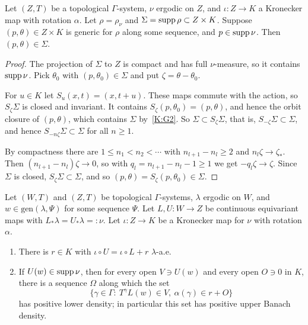 \begin{lemma}\label{K:lem:stab}
Let $(Z,T)$ be a topological $\Gamma$-system, $\nu$ ergodic on $Z$, and $\iota\colon Z\to K$ a
Kronecker map with rotation $\alpha$. Let $\rho=\rho_\nu$ and $\Sigma=\operatorname{supp}\rho\subset Z\times K$.
Suppose $(p,\theta)\in Z\times K$ is generic for $\rho$ along some \Fol{} sequence, and
$p\in\operatorname{supp}\nu$. Then $(p,\theta)\in\Sigma$.
\end{lemma}

\begin{proof}
The projection of $\Sigma$ to $Z$ is compact and has full $\nu$-measure, so it contains
$\operatorname{supp}\nu$. Pick $\theta_0$ with $(p,\theta_0)\in\Sigma$ and put $\zeta=\theta-\theta_0$.

For $u\in K$ let $S_u(x,t)=(x,t+u)$. These maps commute with the action, so $S_\zeta\Sigma$
is closed and invariant. It contains $S_\zeta(p,\theta_0)=(p,\theta)$, and hence the orbit closure
of $(p,\theta)$, which contains $\Sigma$ by~\ref{K:G2}.
So $\Sigma\subset S_\zeta\Sigma$, that is, $S_{-\zeta}\Sigma\subset\Sigma$, and hence
$S_{-n\zeta}\Sigma\subset\Sigma$ for all $n\ge1$.

By compactness there are $1\le n_1<n_2<\cdots$ with $n_{l+1}-n_l\ge2$ and $n_l\zeta\to\zeta_*$.
Then $(n_{l+1}-n_l)\zeta\to0$, so with $q_l=n_{l+1}-n_l-1\ge1$ we get $-q_l\zeta\to\zeta$.
Since $\Sigma$ is closed, $S_\zeta\Sigma\subset\Sigma$, and so
$(p,\theta)=S_\zeta(p,\theta_0)\in\Sigma$.
\end{proof}

\begin{lemma}\label{K:lem:phase}
Let $(W,T)$ and $(Z,T)$ be topological $\Gamma$-systems, $\lambda$ ergodic on $W$, and
$w\in\mathrm{gen}(\lambda,\Psi)$ for some \Fol{} sequence $\Psi$.
Let $L,U\colon W\to Z$ be continuous equivariant maps with $L_*\lambda=U_*\lambda=:\nu$.
Let $\iota\colon Z\to K$ be a Kronecker map for $\nu$ with rotation $\alpha$.
\begin{enumerate}[label=(\alph*)]
\item\label{K:Pa} There is $r\in K$ with $\iota\circ U=\iota\circ L+r$ $\lambda$-a.e.
\item\label{K:Pb} If $U(w)\in\operatorname{supp}\nu$, then for every open $V\ni U(w)$ and every open $O\ni0$ in $K$,
there is a \Fol{} sequence $\Omega$ along which the set
\[
\{\gamma\in\Gamma:\ T^\gamma L(w)\in V,\ \alpha(\gamma)\in r+O\}
\]
has positive lower density; in particular this set has positive upper Banach density.
\end{enumerate}
\end{lemma}

